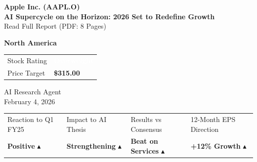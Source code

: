 \documentclass[11pt,a4paper]{article}
\newcommand{\kpiup}{\textcolor{msgreen}{$\blacktriangle$}}
\begin{document}
\begin{center}
    {\color{msblue}\LARGE\bfseries Apple Inc. (AAPL.O)}\\[6pt]
    {\color{msdarkgray}\Large\bfseries AI Supercycle on the Horizon: 2026 Set to Redefine Growth}\\[3pt]
    {\color{msgray}\small Read Full Report (PDF: 8 Pages)}
\end{center}

\vspace{8pt}

\begin{minipage}[t]{0.48\textwidth}
    \textbf{North America}\\[3pt]
    \begin{tabular}{ll}
        Stock Rating & \colorbox{msorange}{\textcolor{white}{\textbf{Overweight}}} \\
        Price Target & \textbf{\$315.00} \\
    \end{tabular}
\end{minipage}
\hfill
\begin{minipage}[t]{0.48\textwidth}
    \raggedleft
    \textcolor{msgray}{\small AI Research Agent}\\
    \textcolor{msgray}{\small February 4, 2026}
\end{minipage}

\vspace{12pt}

\begin{tcolorbox}[colback=mslightgray, colframe=mslightgray, boxrule=0pt, arc=3pt, left=8pt, right=8pt, top=6pt, bottom=6pt]
\begin{tabular}{p{3.5cm}p{3.5cm}p{3.5cm}p{3.5cm}}
    \textcolor{msgray}{\scriptsize Reaction to Q1 FY25} &
    \textcolor{msgray}{\scriptsize Impact to AI Thesis} &
    \textcolor{msgray}{\scriptsize Results vs Consensus} &
    \textcolor{msgray}{\scriptsize 12-Month EPS Direction} \\
    \textbf{Positive} \kpiup &
    \textbf{Strengthening} \kpiup &
    \textbf{Beat on Services} \kpiup &
    \textbf{+12\% Growth} \kpiup \\
\end{tabular}
\end{tcolorbox}
\end{document}
